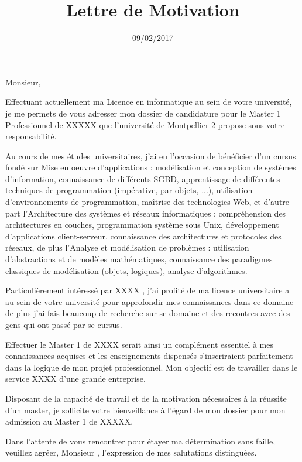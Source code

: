 \documentclass[11pt,a4paper,sans]{moderncv}
\title{Lettre de Motivation}
\begin{document}
\date{09/02/2017}
\opening{}
\closing{}
\makelettertitle
{}


 Monsieur,

Effectuant actuellement ma Licence en informatique au sein de votre université, je me permets de vous adresser mon dossier de candidature pour le Master 1 Professionnel de XXXXX que l’université de Montpellier 2 propose sous votre responsabilité.

Au cours de mes études universitaires, j’ai eu l’occasion de bénéficier d’un cursus fondé sur Mise en oeuvre d'applications : modélisation et conception de systèmes d'information, connaissance de différents SGBD, apprentissage de différentes techniques de programmation (impérative, par objets, ...), utilisation d'environnements de programmation, maîtrise des technologies Web, et d’autre part l'Architecture des systèmes et réseaux informatiques : compréhension des architectures en couches, programmation système sous Unix, développement d'applications client-serveur, connaissance des architectures et protocoles des réseaux, de plus l'Analyse et modélisation de problèmes : utilisation d'abstractions et de modèles mathématiques, connaissance des paradigmes classiques de modélisation (objets, logiques), analyse d'algorithmes.

    Particulièrement intéressé par XXXX , j’ai profité de ma licence universitaire a au sein de votre université pour approfondir mes connaissances dans ce domaine de plus j'ai fais beaucoup de recherche sur se domaine et des recontres avec des gens qui ont passé par se cursus. 

Effectuer le Master 1 de XXXX serait ainsi un complément essentiel à mes connaissances acquises et les enseignements dispensés s’inscriraient parfaitement dans la logique de mon projet professionnel. Mon objectif est de travailler dans le service XXXX d’une grande entreprise. 

Disposant de la capacité de travail et de la motivation nécessaires à la réussite d’un master, je sollicite votre bienveillance à l’égard de mon dossier pour mon admission au Master 1 de XXXXX.

Dans l’attente de vous rencontrer pour étayer ma détermination sans faille, veuillez agréer, Monsieur , l’expression de mes salutations distinguées.
\end{document}
